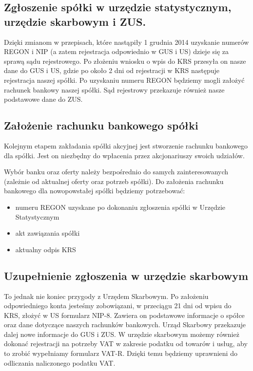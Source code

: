 \documentclass[11pt]{article}
\begin{document}
	\subsection{Zgłoszenie spółki w urzędzie statystycznym,  urzędzie skarbowym i ZUS.}
	
	Dzięki zmianom w przepisach, które nastąpiły 1 grudnia 2014 uzyskanie numerów REGON i NIP (a zatem rejestracja odpowiednio w GUS i US) dzieje się za sprawą sądu rejestrowego. Po złożeniu wniosku o wpis do KRS przesyła on nasze dane do GUS i US, gdzie po około 2 dni od rejestracji w KRS następuje rejestracja naszej spółki. Po uzyskaniu numeru REGON będziemy mogli założyć rachunek bankowy naszej spółki. Sąd rejestrowy przekazuje również nasze podstawowe dane do ZUS.
	
	\subsection{Założenie rachunku bankowego spółki}
	
	Kolejnym etapem zakładania spółki akcyjnej jest stworzenie rachunku bankowego dla spółki. Jest on niezbędny do wpłacenia przez akcjonariuszy swoich udziałów.
	
	  
Wybór banku oraz oferty należy bezpośrednio do samych zainteresowanych (zależnie od aktualnej oferty oraz potrzeb spółki). Do założenia rachunku bankowego dla nowopowstałej spółki będziemy potrzebować:
 \begin{itemize}
 	
	\item numeru REGON uzyskane po dokonaniu zgłoszenia spółki w Urzędzie Statystycznym
	\item akt zawiązania spółki
	\item aktualny odpis KRS 	
 	
 \end{itemize}

	\subsection{Uzupełnienie zgłoszenia w urzędzie skarbowym}


To jednak nie koniec przygody z Urzędem Skarbowym. Po założeniu odpowiedniego konta jesteśmy zobowiązani, w przeciągu 21 dni od wpisu do KRS, złożyć w US formularz NIP-8. Zawiera on podstawowe informacje o spółce oraz dane dotyczące naszych rachunków bankowych. Urząd Skarbowy przekazuje dalej nowe informacje do GUS i ZUS. W urzędzie skarbowym możemy również dokonać rejestracji na potrzeby VAT w zakresie podatku od towarów i usług, aby to zrobić wypełniamy formularz VAT-R. Dzięki temu będziemy uprawnieni do odliczania naliczonego podatku VAT.
\end{document}
